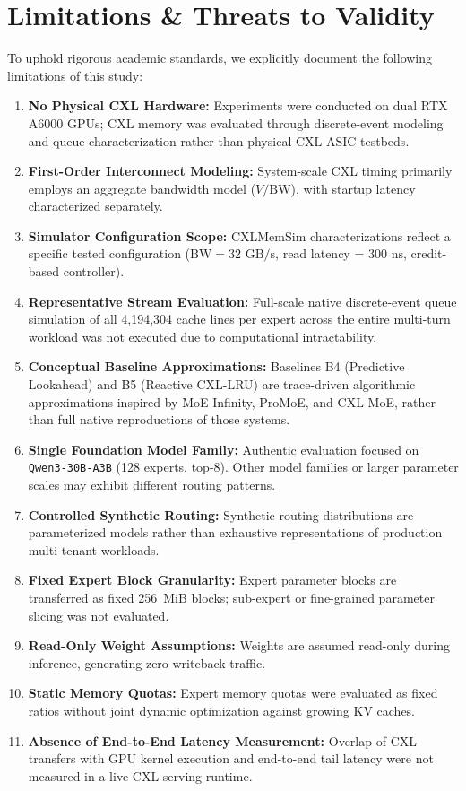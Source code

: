\documentclass[10pt,journal,compsoc]{IEEEtran}
\begin{document}
\section{Limitations \& Threats to Validity}
\label{sec:limitations}

To uphold rigorous academic standards, we explicitly document the following limitations of this study:
\begin{enumerate}
    \item \textbf{No Physical CXL Hardware:} Experiments were conducted on dual RTX A6000 GPUs; CXL memory was evaluated through discrete-event modeling and queue characterization rather than physical CXL ASIC testbeds.
    \item \textbf{First-Order Interconnect Modeling:} System-scale CXL timing primarily employs an aggregate bandwidth model ($V/\text{BW}$), with startup latency characterized separately.
    \item \textbf{Simulator Configuration Scope:} CXLMemSim characterizations reflect a specific tested configuration ($\text{BW} = 32\text{ GB/s}$, read latency = $300\text{ ns}$, credit-based controller).
    \item \textbf{Representative Stream Evaluation:} Full-scale native discrete-event queue simulation of all 4,194,304 cache lines per expert across the entire multi-turn workload was not executed due to computational intractability.
    \item \textbf{Conceptual Baseline Approximations:} Baselines B4 (Predictive Lookahead) and B5 (Reactive CXL-LRU) are trace-driven algorithmic approximations inspired by MoE-Infinity, ProMoE, and CXL-MoE, rather than full native reproductions of those systems.
    \item \textbf{Single Foundation Model Family:} Authentic evaluation focused on \texttt{Qwen3-30B-A3B} (128 experts, top-8). Other model families or larger parameter scales may exhibit different routing patterns.
    \item \textbf{Controlled Synthetic Routing:} Synthetic routing distributions are parameterized models rather than exhaustive representations of production multi-tenant workloads.
    \item \textbf{Fixed Expert Block Granularity:} Expert parameter blocks are transferred as fixed 256~MiB blocks; sub-expert or fine-grained parameter slicing was not evaluated.
    \item \textbf{Read-Only Weight Assumptions:} Weights are assumed read-only during inference, generating zero writeback traffic.
    \item \textbf{Static Memory Quotas:} Expert memory quotas were evaluated as fixed ratios without joint dynamic optimization against growing KV caches.
    \item \textbf{Absence of End-to-End Latency Measurement:} Overlap of CXL transfers with GPU kernel execution and end-to-end tail latency were not measured in a live CXL serving runtime.
\end{enumerate}
\end{document}

